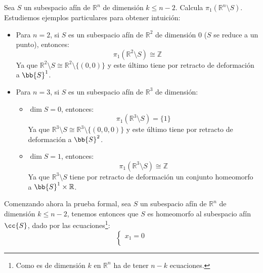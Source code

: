 \begin{ejercicio}
    Sea $S$ un subespacio afín de $\mathbb{R}^n$ de dimensión $k\leq n-2$. Calcula $\pi_1(\mathbb{R}^n\setminus S)$.\\

    \noindent
    Estudiemos ejemplos particulares para obtener intuición:
    \begin{itemize}
        \item Para $n=2$, si $S$ es un subespacio afín de $\mathbb{R}^2$ de dimensión $0$ ($S$ se reduce a un punto), entonces:
            \begin{equation*}
                \pi_1(\mathbb{R}^2\setminus S) \cong \mathbb{Z}
            \end{equation*}
            Ya que $\mathbb{R}^2\setminus S \cong \mathbb{R}^2\setminus \{(0,0)\}$ y este último tiene por retracto de deformación a $\bb{S}^1$.
        \item Para $n=3$, si $S$ es un subespacio afín de $\mathbb{R}^3$ de dimensión:
            \begin{itemize}
                \item $\dim S = 0$, entonces:
                    \begin{equation*}
                        \pi_1(\mathbb{R}^3\setminus S) = \{1\}
                    \end{equation*}
                    Ya que $\mathbb{R}^3\setminus S \cong \mathbb{R}^3\setminus \{(0,0,0)\}$ y este último tiene por retracto de deformación a $\bb{S}^2$.
                \item $\dim S = 1$, entonces:
                    \begin{equation*}
                        \pi_1(\mathbb{R}^3\setminus S) \cong \mathbb{Z}
                    \end{equation*}
                    Ya que $\mathbb{R}^3\setminus S$ tiene por retracto de deformación un conjunto homeomorfo a $\bb{S}^1\times \mathbb{R}$.
            \end{itemize}
    \end{itemize}
    Comenzando ahora la prueba formal, sea $S$ un subespacio afín de $\mathbb{R}^n$ de dimensión $k \leq n-2$, tenemos entonces que $S$ es homeomorfo al subespacio afín $\cc{S}$, dado por las ecuaciones\footnote{Como es de dimensión $k$ en $\mathbb{R}^n$ ha de tener $n-k$ ecuaciones.}:
    \begin{equation*}
        \left\{\begin{array}{l}
            x_1 = 0 \\

\end{array}
\end{equation*}
\end{ejercicio}
